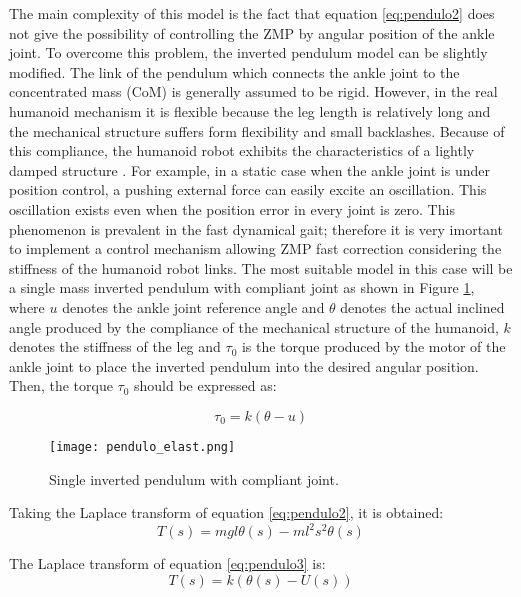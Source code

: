 The main complexity of this model is the fact that equation \ref{eq:pendulo2} does not give the possibility of controlling the ZMP by angular position of the ankle joint. To overcome this problem, the inverted pendulum model can be slightly modified. The link of the pendulum which connects the ankle joint to the concentrated mass (CoM) is generally assumed to be rigid. However, in the real humanoid mechanism it is flexible because the leg length is relatively long and the mechanical structure suffers form flexibility and small backlashes. Because of this compliance, the humanoid robot exhibits the characteristics of a lightly damped structure \cite{Kim2004}. For example, in a static case when the ankle joint is under position control, a pushing external force can easily excite an oscillation. This oscillation exists even when the position error in every joint is zero. This phenomenon is prevalent in the fast dynamical gait; therefore it is very imortant to implement a control mechanism allowing ZMP fast correction considering the stiffness of the humanoid robot links. The most suitable model in this case will be a single mass inverted pendulum with compliant joint as shown in Figure \ref{fig:pendulo_elast}, where $u$ denotes the ankle joint reference angle and $\theta$ denotes the actual inclined angle produced by the compliance of the mechanical structure of the humanoid, $k$ denotes the stiffness of the leg and $\tau_0$ is the torque produced by the motor of the ankle joint to place the inverted pendulum into the desired angular position. Then, the torque $\tau_0$ should be expressed as:

\begin{equation}
\tau_0 = k(\theta - u)
\label{eq:pendulo3}
\end{equation}

\begin{figure}
\centering
\texttt{[image: pendulo\_elast.png]}
\caption{Single inverted pendulum with compliant joint.}
\label{fig:pendulo_elast}
\end{figure}

Taking the Laplace transform of equation \ref{eq:pendulo2}, it is obtained: 
\begin{equation}
T(s) = mgl\theta(s)- ml^2s^2\theta(s) 
\label{eq:par}
\end{equation}

The Laplace transform of equation \ref{eq:pendulo3} is:
\begin{equation}
T(s) = k(\theta(s) - U(s))
\label{eq:par2}
\end{equation}

